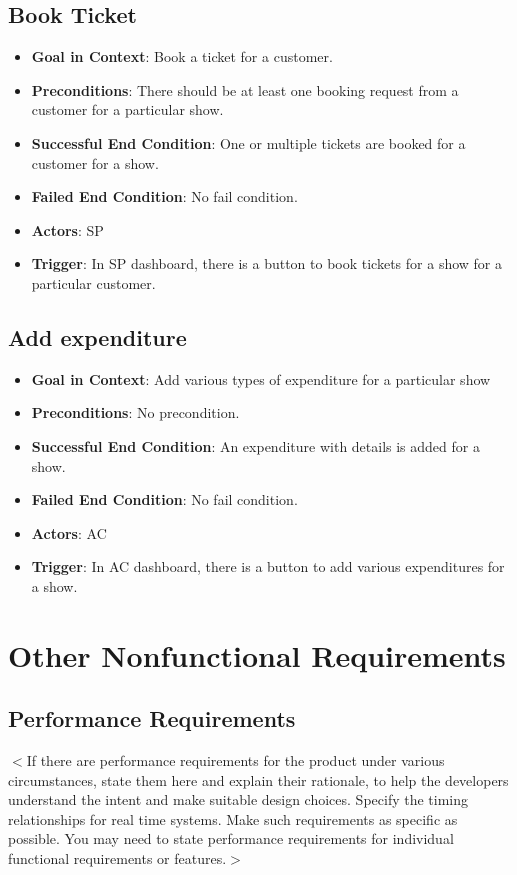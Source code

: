 \documentclass{scrreprt}
\begin{document}
\section{Book Ticket}
\begin{itemize}
\item \textbf{Goal in Context}: Book a ticket for a customer.
\item \textbf{Preconditions}: There should be at least one booking request from a customer for a particular show. 
\item \textbf{Successful End Condition}: One or multiple tickets are booked for a customer for a show.
\item \textbf{Failed End Condition}: No fail condition.
\item \textbf{Actors}: SP
\item \textbf{Trigger}: In SP dashboard, there is a button to book tickets for a show for a particular customer.
\end{itemize}


\section{Add expenditure}
\begin{itemize}
\item \textbf{Goal in Context}: Add various types of expenditure for a particular show
\item \textbf{Preconditions}: No precondition. 
\item \textbf{Successful End Condition}: An expenditure with details is added for a show.
\item \textbf{Failed End Condition}: No fail condition.
\item \textbf{Actors}: AC
\item \textbf{Trigger}: In AC dashboard, there is a button to add various expenditures for a show.
\end{itemize}



\chapter{Other Nonfunctional Requirements}

\section{Performance Requirements}
$<$If there are performance requirements for the product under various 
circumstances, state them here and explain their rationale, to help the 
developers understand the intent and make suitable design choices. Specify the 
timing relationships for real time systems. Make such requirements as specific 
as possible. You may need to state performance requirements for individual 
functional requirements or features.$>$
\end{document}
